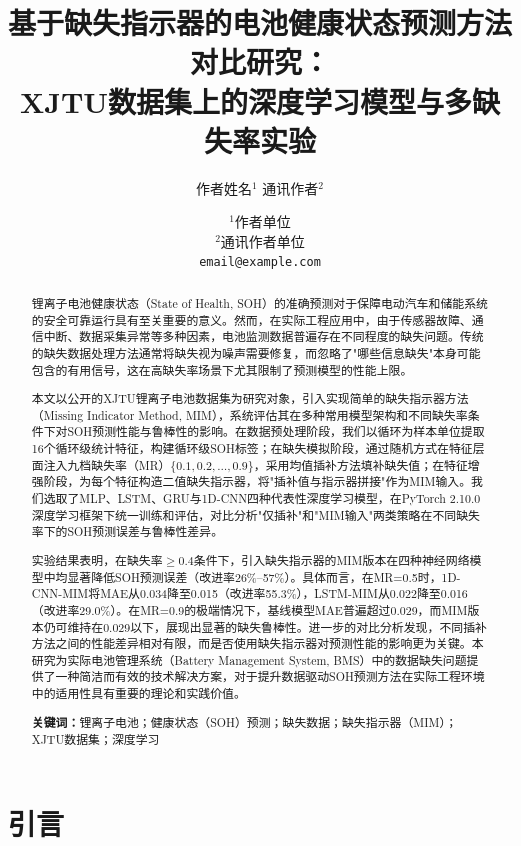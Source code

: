 \documentclass[10pt,a4paper]{ctexart}
\title{\textbf{基于缺失指示器的电池健康状态预测方法对比研究：\\XJTU数据集上的深度学习模型与多缺失率实验}}
\author{作者姓名$^{1}$ \quad 通讯作者$^{2}$}
\date{$^{1}$作者单位 \\ $^{2}$通讯作者单位 \\ \texttt{email@example.com}}
\begin{document}
\maketitle

\begin{abstract}
锂离子电池健康状态（State of Health, SOH）的准确预测对于保障电动汽车和储能系统的安全可靠运行具有至关重要的意义。然而，在实际工程应用中，由于传感器故障、通信中断、数据采集异常等多种因素，电池监测数据普遍存在不同程度的缺失问题。传统的缺失数据处理方法通常将缺失视为噪声需要修复，而忽略了"哪些信息缺失"本身可能包含的有用信号，这在高缺失率场景下尤其限制了预测模型的性能上限。

本文以公开的XJTU锂离子电池数据集为研究对象，引入实现简单的缺失指示器方法（Missing Indicator Method, MIM），系统评估其在多种常用模型架构和不同缺失率条件下对SOH预测性能与鲁棒性的影响。在数据预处理阶段，我们以循环为样本单位提取16个循环级统计特征，构建循环级SOH标签；在缺失模拟阶段，通过随机方式在特征层面注入九档缺失率（MR）$\{0.1, 0.2, \ldots, 0.9\}$，采用均值插补方法填补缺失值；在特征增强阶段，为每个特征构造二值缺失指示器，将"插补值与指示器拼接"作为MIM输入。我们选取了MLP、LSTM、GRU与1D-CNN四种代表性深度学习模型，在PyTorch 2.10.0深度学习框架下统一训练和评估，对比分析"仅插补"和"MIM输入"两类策略在不同缺失率下的SOH预测误差与鲁棒性差异。

实验结果表明，在缺失率$\geq 0.4$条件下，引入缺失指示器的MIM版本在四种神经网络模型中均显著降低SOH预测误差（改进率26\%--57\%）。具体而言，在MR=0.5时，1D-CNN-MIM将MAE从0.034降至0.015（改进率55.3\%），LSTM-MIM从0.022降至0.016（改进率29.0\%）。在MR=0.9的极端情况下，基线模型MAE普遍超过0.029，而MIM版本仍可维持在0.029以下，展现出显著的缺失鲁棒性。进一步的对比分析发现，不同插补方法之间的性能差异相对有限，而是否使用缺失指示器对预测性能的影响更为关键。本研究为实际电池管理系统（Battery Management System, BMS）中的数据缺失问题提供了一种简洁而有效的技术解决方案，对于提升数据驱动SOH预测方法在实际工程环境中的适用性具有重要的理论和实践价值。

\textbf{关键词：}锂离子电池；健康状态（SOH）预测；缺失数据；缺失指示器（MIM）；XJTU数据集；深度学习
\end{abstract}

\section{引言}\label{sec:intro}
\end{document}
